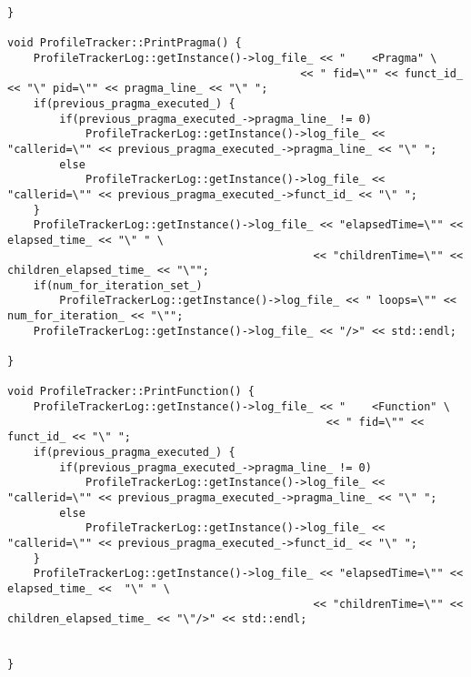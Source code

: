 \documentclass[a4paper,11pt,twoside]{book}
\begin{document}
\begin{lstlisting}[language=CCC, caption=profile\_tracker.cpp]
}
 
void ProfileTracker::PrintPragma() {
	ProfileTrackerLog::getInstance()->log_file_ << "	<Pragma" \
											 << " fid=\"" << funct_id_ << "\" pid=\"" << pragma_line_ << "\" ";
	if(previous_pragma_executed_) {
		if(previous_pragma_executed_->pragma_line_ != 0)
			ProfileTrackerLog::getInstance()->log_file_ << "callerid=\"" << previous_pragma_executed_->pragma_line_ << "\" "; 
		else 
			ProfileTrackerLog::getInstance()->log_file_ << "callerid=\"" << previous_pragma_executed_->funct_id_ << "\" "; 
	}
	ProfileTrackerLog::getInstance()->log_file_ << "elapsedTime=\"" << elapsed_time_ << "\" " \
											   << "childrenTime=\"" << children_elapsed_time_ << "\"";
	if(num_for_iteration_set_)
	 	ProfileTrackerLog::getInstance()->log_file_ << " loops=\"" << num_for_iteration_ << "\"";
	ProfileTrackerLog::getInstance()->log_file_ << "/>" << std::endl; 

}

void ProfileTracker::PrintFunction() {
	ProfileTrackerLog::getInstance()->log_file_ << "	<Function" \
												 << " fid=\"" << funct_id_ << "\" ";
	if(previous_pragma_executed_) {
		if(previous_pragma_executed_->pragma_line_ != 0)
			ProfileTrackerLog::getInstance()->log_file_ << "callerid=\"" << previous_pragma_executed_->pragma_line_ << "\" "; 
		else 
			ProfileTrackerLog::getInstance()->log_file_ << "callerid=\"" << previous_pragma_executed_->funct_id_ << "\" "; 
	}
	ProfileTrackerLog::getInstance()->log_file_ << "elapsedTime=\"" << elapsed_time_ <<  "\" " \
											   << "childrenTime=\"" << children_elapsed_time_ << "\"/>" << std::endl; 


}
\end{lstlisting}
\end{document}
